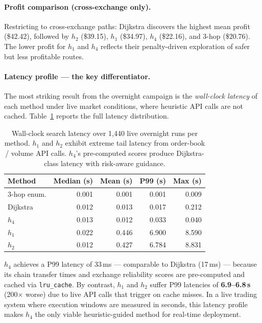 \paragraph{Profit comparison (cross-exchange only).}
Restricting to cross-exchange paths: Dijkstra discovers the highest mean profit (\$42.42), followed by $h_2$ (\$39.15), $h_1$ (\$34.97), $h_4$ (\$22.16), and 3-hop (\$20.76). The lower profit for $h_1$ and $h_4$ reflects their penalty-driven exploration of safer but less profitable routes.

\paragraph{Latency profile — the key differentiator.}
The most striking result from the overnight campaign is the \emph{wall-clock latency} of each method under live market conditions, where heuristic API calls are not cached. Table~\ref{tab:latency} reports the full latency distribution.

\begin{table}[t]
\centering
\small
\caption{Wall-clock search latency over 1{,}440 live overnight runs per method. $h_1$ and $h_2$ exhibit extreme tail latency from order-book / volume API calls. $h_4$'s pre-computed scores produce Dijkstra-class latency with risk-aware guidance.}
\label{tab:latency}
\begin{tabular}{lrrrr}
\toprule
\textbf{Method} & \textbf{Median (s)} & \textbf{Mean (s)} & \textbf{P99 (s)} & \textbf{Max (s)} \\
\midrule
3-hop enum. & 0.001 & 0.001 & 0.001 & 0.009 \\
Dijkstra     & 0.012 & 0.013 & 0.017 & 0.212 \\
$h_4$        & 0.013 & 0.012 & 0.033 & 0.040 \\
$h_1$        & 0.022 & 0.446 & 6.900 & 8.590 \\
$h_2$        & 0.012 & 0.427 & 6.784 & 8.831 \\
\bottomrule
\end{tabular}
\end{table}

$h_4$ achieves a P99 latency of 33\,ms — comparable to Dijkstra (17\,ms) — because its chain transfer times and exchange reliability scores are pre-computed and cached via \texttt{lru\_cache}. By contrast, $h_1$ and $h_2$ suffer P99 latencies of \textbf{6.9--6.8\,s} (200$\times$ worse) due to live API calls that trigger on cache misses. In a live trading system where execution windows are measured in seconds, this latency profile makes $h_4$ the only viable heuristic-guided method for real-time deployment.

